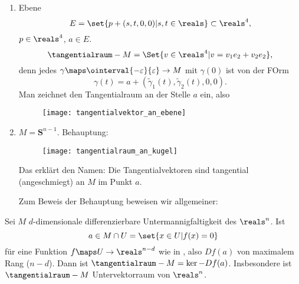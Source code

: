 \begin{beispiele*}
  \begin{enumerate}
    \item Ebene
    \begin{equation*}
      E=\set{p+(s,t,0,0)|s,t\in \reals}\subset \reals^4,
    \end{equation*}
    \( p\in \reals^4 \), \( a\in E \).
    \begin{equation*}
      \tangentialraum-{M}=\Set{v\in \reals^4|v=v_1e_2+v_2e_2},
    \end{equation*}
    denn jedes \( \gamma\maps \ointerval{-\varepsilon}{\varepsilon}\to M \) mit \( \gamma(0) \) ist von der FOrm
    \begin{equation*}
      \gamma(t)=a+(\tilde{\gamma}_1(t),\tilde{\gamma}_2(t),0,0).
    \end{equation*}
    Man zeichnet den Tangentialraum an der Stelle \( a \) ein, also
    \begin{figure}[H]
      \centering
      \texttt{[image: tangentialvektor\_an\_ebene]}
      \label{fig:tangentialvektor_an_ebene}
    \end{figure}
    \item \( M=\mathbf{S}^{n-1} \). Behauptung: 
    \begin{figure}[H]
      \centering
      \texttt{[image: tangentialraum\_an\_kugel]}
      \label{fig:tangentialraum_an_kugel}
    \end{figure}
    Das erklärt den Namen: Die Tangentialvektoren sind tangential (angeschmiegt) an \( M \) im Punkt \( a \).
    
    Zum Beweis der Behauptung beweisen wir allgemeiner:
  \end{enumerate}
\end{beispiele*}
\begin{satz}\label{tangentialraum_ist_tangential}
  Sei \( M \) \( d \)-dimensionale differenzierbare Untermannigfaltigkeit des \( \reals^n \). Ist 
  \begin{equation*}
    a\in M\cap U =\set{x\in U |f(x)=0}
  \end{equation*}
  für eine Funktion \( f\maps U\to \reals^{n-d} \) wie in , also \( Df(a) \) von maximalem Rang (\( n-d \)). Dann ist \( \tangentialraum-{M}=\ker-{Df(a)} \). Insbesondere ist \( \tangentialraum-{M} \) Untervektorraum von \( \reals^n \).
\end{satz}
